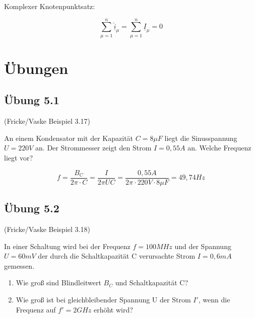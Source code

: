 \documentclass[
  ngerman,
  letterpaper,
]{scrbook}
\begin{document}
Komplexer Knotenpunktsatz:

\[\sum_{\mu = 1}^n \underline{\hat{i}}_{\mu} = \sum_{\mu = 1}^n \underline{I}_{\mu} = 0\]

\section{Übungen}\label{uxfcbungen-2}

\subsection{Übung 5.1}\label{uxfcbung-5.1}

(Fricke/Vaske Beispiel 3.17)

An einem Kondensator mit der Kapazität \(C = 8 \mu F\) liegt die
Sinusspannung \(U = 220V\) an. Der Strommesser zeigt den Strom
\(I = 0,55A\) an. Welche Frequenz liegt vor?

\begin{tcolorbox}[enhanced jigsaw, titlerule=0mm, rightrule=.15mm, toprule=.15mm, colback=white, toptitle=1mm, bottomrule=.15mm, coltitle=black, leftrule=.75mm, arc=.35mm, colbacktitle=quarto-callout-caution-color!10!white, opacityback=0, bottomtitle=1mm, colframe=quarto-callout-caution-color-frame, opacitybacktitle=0.6, breakable, title=\textcolor{quarto-callout-caution-color}{\faFire}\hspace{0.5em}{Lösung 5.1}, left=2mm]

\[f = \frac{B_C}{2 \pi \cdot C} = \frac{I}{2 \pi U C} = \frac{0,55A}{2\pi \cdot 220V \cdot 8 \mu F} = 49,74 Hz\]

\end{tcolorbox}

\subsection{Übung 5.2}\label{uxfcbung-5.2}

(Fricke/Vaske Beispiel 3.18)

In einer Schaltung wird bei der Frequenz \(f = 100 MHz\) und der
Spannung \(U = 60 mV\) der durch die Schaltkapazität C verursachte Strom
\(I = 0,6 mA\) gemessen.

\begin{enumerate}
\def\labelenumi{\alph{enumi})}
\item
  Wie groß sind Blindleitwert \(B_C\) und Schaltkapazität C?
\item
  Wie groß ist bei gleichbleibender Spannung U der Strom \(I'\), wenn
  die Frequenz auf \(f' = 2 GHz\) erhöht wird?
\end{enumerate}
\end{document}
